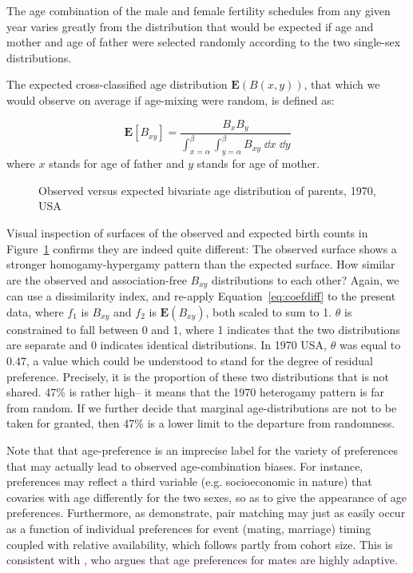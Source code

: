  \FloatBarrier
The age combination of the male and female fertility schedules from
any given year varies greatly from the distribution that would be expected if
age and mother and age of father were selected randomly according to the two
single-sex distributions.

The expected cross-classified age distribution $\textbf{E}(B(x,y))$, that which
we would observe on average if age-mixing were random, is defined as:

\begin{equation}
\label{eq:expected}
\textbf{E}\left[B_{xy}\right] = \frac{B_x B_y}{\int _{x = \alpha} ^\beta \int
_{y = \alpha} ^\beta B_{xy} \; \dd x \;\dd y}
\end{equation}
where $x$ stands for age of father and $y$ stands for age of mother.

\begin{figure}[ht!]
        \centering  
          \caption{Observed versus expected bivariate age distribution of
          parents, 1970, USA}
          \label{fig:US1970obsexp}
\end{figure}

Visual inspection of surfaces of the observed and expected birth counts in
Figure~\ref{fig:US1970obsexp} confirms they are indeed quite different: The
observed surface shows a stronger homogamy-hypergamy pattern than the expected surface. 
How similar are the
observed and association-free $B_{xy}$ distributions to each other? Again, we
can use a dissimilarity index, and re-apply Equation~\ref{eq:coefdiff} to the
present data, where $f_1$ is $B_{xy}$ and $f_2$ is $\textbf{E}(B_{xy})$, both scaled 
to sum to 1. $\theta$ is constrained to fall between 0 and 1, where 1 indicates that the
two distributions are separate and 0 indicates identical distributions. In 1970 USA,
$\theta$ was equal to $0.47$, a value which could be understood to stand for the
degree of residual preference. Precisely, it is the proportion of these two
distributions that is not shared. 47\% is rather high-- it means that the 1970
heterogamy pattern is far from random. If we further decide that marginal
age-distributions are not to be taken for granted, then 47\% is a lower limit to
the departure from randomness.

Note that that age-preference is an imprecise label for the variety
of preferences that may actually lead to observed age-combination biases. For
instance, preferences may reflect a third variable (e.g. socioeconomic
in nature) that covaries with age differently for the two sexes, so as to give
the appearance of age preferences. Furthermore, as \citet{bergstrom1994sweden}
demonstrate, pair matching may just as easily occur as a function of individual
preferences for event (mating, marriage) timing coupled with relative
availability, which follows partly from cohort size. This is consistent with
\citet{bhrolchain2001flexibility}, who argues that age preferences for
mates are highly adaptive.

